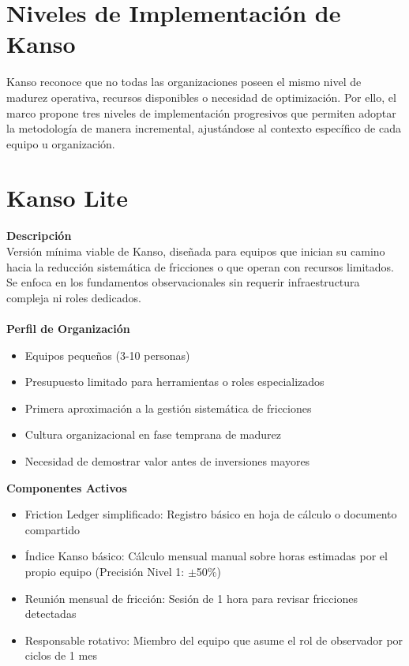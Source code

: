 \section*{Niveles de Implementación de Kanso}

Kanso reconoce que no todas las organizaciones poseen el mismo nivel de madurez operativa, recursos disponibles o necesidad de optimización. Por ello, el marco propone tres niveles de implementación progresivos que permiten adoptar la metodología de manera incremental, ajustándose al contexto específico de cada equipo u organización.

\section{Kanso Lite}

\textbf{Descripción}\\
Versión mínima viable de Kanso, diseñada para equipos que inician su camino hacia la reducción sistemática de fricciones o que operan con recursos limitados. Se enfoca en los fundamentos observacionales sin requerir infraestructura compleja ni roles dedicados.
\\
\\
\textbf{Perfil de Organización}
\begin{itemize}
    \item Equipos pequeños (3-10 personas)
    \item Presupuesto limitado para herramientas o roles especializados
    \item Primera aproximación a la gestión sistemática de fricciones
    \item Cultura organizacional en fase temprana de madurez
    \item Necesidad de demostrar valor antes de inversiones mayores
\end{itemize}

\textbf{Componentes Activos}
\begin{itemize}
    \item Friction Ledger simplificado: Registro básico en hoja de cálculo o documento compartido
    \item Índice Kanso básico: Cálculo mensual manual sobre horas estimadas por el propio equipo (Precisión Nivel 1: $\pm$50\%)
    \item Reunión mensual de fricción: Sesión de 1 hora para revisar fricciones detectadas
    \item Responsable rotativo: Miembro del equipo que asume el rol de observador por ciclos de 1 mes
\end{itemize}


